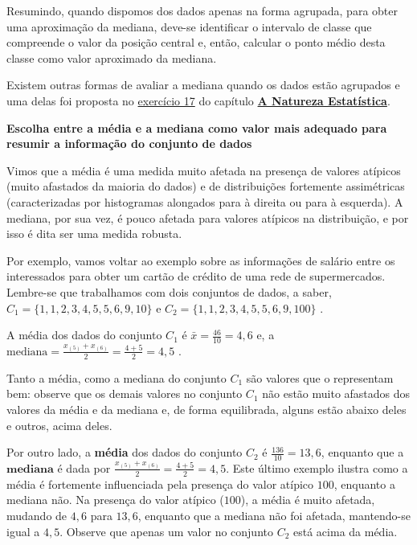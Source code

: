 Resumindo, quando dispomos dos dados apenas na forma agrupada, para obter uma aproximação da mediana, deve-se identificar o intervalo de classe que compreende o valor da posição central e, então, calcular o ponto médio desta classe como valor aproximado da mediana.

Existem outras formas de avaliar a mediana quando os dados estão agrupados e uma delas foi proposta no \hyperref[chap-est1-exerc-17]{exercício 17} do capítulo \textbf{\hyperref[est1-chap]{A Natureza Estatística}}.

\textbf{Escolha entre a média e a mediana como valor mais adequado para resumir a informação do conjunto de dados}

Vimos que a média é uma medida muito afetada na presença de valores atípicos (muito afastados da maioria do dados) e de distribuições fortemente assimétricas (caracterizadas por histogramas alongados para à direita ou para à esquerda). A mediana, por sua vez, é pouco afetada para valores atípicos na distribuição, e por isso é dita ser uma medida robusta.

Por exemplo, vamos voltar ao exemplo sobre as informações de salário entre os interessados para obter um cartão de crédito de uma rede de supermercados. Lembre-se que trabalhamos com dois conjuntos de dados, a saber, \(C_1=\{1, 1, 2, 3, 4, 5, 5, 6, 9, 10\}\) e \(C_2=\{1, 1, 2, 3, 4, 5, 5, 6, 9, 100\}\) .

A média dos dados do conjunto \(C_1\) é \(\displaystyle \bar{x}=\frac{46}{10}=4,6\) e, a \(\displaystyle \text{mediana}=\frac{x_{(5)}+x_{(6)}}{2}=\frac{4+5}{2}=4,5\) .

Tanto a média, como a mediana do conjunto \(C_1\) são valores que o representam bem: observe que os demais valores no conjunto \(C_1\) não estão muito afastados dos valores da média e da mediana e, de forma equilibrada, alguns estão abaixo deles e outros, acima deles.

Por outro lado, a \textbf{média} dos dados do conjunto \(C_2\) é \(\displaystyle \frac{136}{10}=13,6\), enquanto que a \(\textbf{mediana}\) é dada por  \(\displaystyle \frac{x_{(5)}+x_{(6)}}{2}=\frac{4+5}{2}=4,5\).  Este último exemplo ilustra como a média é fortemente influenciada pela presença do valor atípico $100$, enquanto a mediana não.   Na presença do valor atípico ($100$), a média é muito afetada, mudando de $4{,}6$ para $13{,}6$, enquanto que a mediana não foi afetada, mantendo-se igual a $4{,}5$.  Observe que apenas um valor no conjunto \(C_2\) está acima da média.

